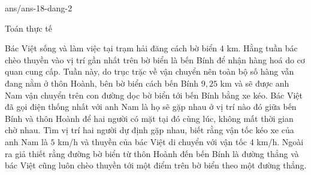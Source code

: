 \begin{indapan}{10}
	{ans/ans-18-dang-2}
\end{indapan}
\begin{dang}{Toán thực tế}
	
\end{dang}

\viduminhhoa

\begin{vd}%
	Bác Việt sống và làm việc tại trạm hải đăng cách bờ biển $4$ km. Hằng tuần bác chèo thuyền vào vị trí gần nhất trên bờ biển là bến Bính để nhận hàng hoá do cơ quan cung cấp. Tuần này, do trục trặc về vận chuyển nên toàn bộ số hàng vẫn đang nằm ở thôn Hoành, bên bờ biển cách bến Bính $9{,}25$ km và sẽ được anh Nam vận chuyển trên con đường dọc bờ biển tới bến Bính bằng xe kéo. Bác Việt đã gọi điện thống nhất với anh Nam là họ sẽ gặp nhau ở vị trí nào đó giữa bến Bính và thôn Hoành để hai người có mặt tại đó cùng lúc, không mất thời gian chờ nhau. Tìm vị trí hai người dự định gặp nhau, biết rằng vận tốc kéo xe của anh Nam là $5$ km/h và thuyền của bác Việt di chuyển với vận tốc $4$ km/h. Ngoài ra giả thiết rằng đường bờ biển từ thôn Hoành đến bến Bính là đường thẳng và bác Việt cũng luôn chèo thuyền tới một điểm trên bờ biển theo một đường thẳng.
\end{vd}

